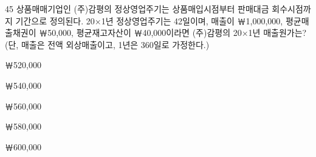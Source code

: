 \begin{question}{45}
상품매매기업인 (주)감평의 정상영업주기는 상품매입시점부터 판매대금 회수시점까지 기간으로 정의된다. 20×1년 정상영업주기는 42일이며, 매출이 ￦1,000,000, 평균매출채권이 ￦50,000, 평균재고자산이 ￦40,000이라면 (주)감평의 20×1년 매출원가는? (단, 매출은 전액 외상매출이고, 1년은 360일로 가정한다.)
\begin{choices}
  \item ￦520,000
  \item ￦540,000
  \item ￦560,000
  \item ￦580,000
  \item ￦600,000
\end{choices}
\end{question}
